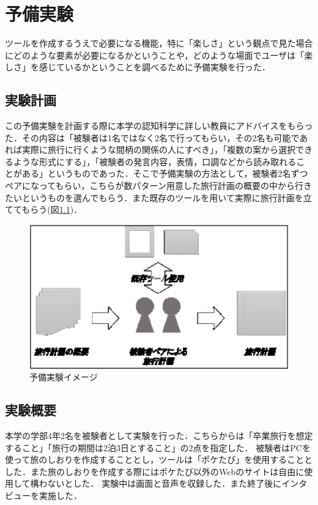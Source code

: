 \documentclass{funthesis}
\begin{document}
\chapter{予備実験}%
ツールを作成するうえで必要になる機能，特に「楽しさ」という観点で見た場合にどのような要素が必要になるかということや，どのような場面でユーザは「楽しさ」を感じているかということを調べるために予備実験を行った．

\section{実験計画}
この予備実験を計画する際に本学の認知科学に詳しい教員にアドバイスをもらった．その内容は「被験者は1名ではなく2名で行ってもらい，その2名も可能であれば実際に旅行に行くような間柄の関係の人にすべき」，「複数の案から選択できるような形式にする」，「被験者の発言内容，表情，口調などから読み取れることがある」というものであった．そこで予備実験の方法として，被験者2名ずつペアになってもらい，こちらが数パターン用意した旅行計画の概要の中から行きたいというものを選んでもらう．また既存のツールを用いて実際に旅行計画を立ててもらう(図\ref{Lsemiexp})．
\begin{figure}[htpb]
\begin{center}
\includegraphics[scale=0.4]{semiexp.eps}
\end{center}
\caption{予備実験イメージ}
\label{Lsemiexp}
\end{figure}


\section{実験概要}
本学の学部4年2名を被験者として実験を行った．こちらからは「卒業旅行を想定すること」「旅行の期間は2泊3日とすること」の2点を指定した．
被験者はPCを使って旅のしおりを作成することとし，ツールは「ポケたび」を使用することとした．また旅のしおりを作成する際にはポケたび以外のWebのサイトは自由に使用して構わないとした．
実験中は画面と音声を収録した．また終了後にインタビューを実施した．
\end{document}
